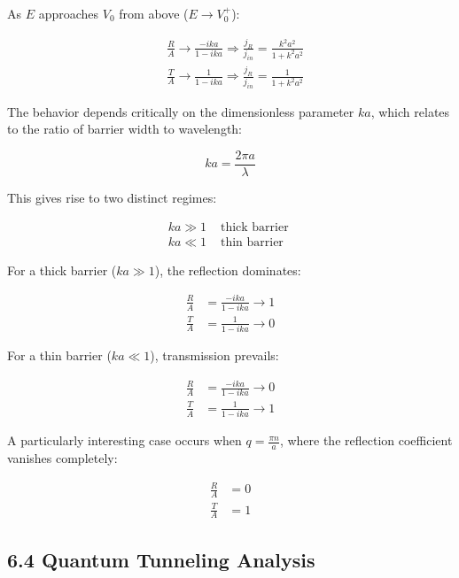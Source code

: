 \documentclass[10pt]{article}
\begin{document}
As $E$ approaches $V_0$ from above ($E \rightarrow V_0^+$):

\begin{align*}
& \frac{R}{A} \rightarrow \frac{-i k a}{1-i k a} \Longrightarrow \frac{j_{R}}{j_{i n}}=\frac{k^{2} a^{2}}{1+k^{2} a^{2}}  \tag{6.67}\\
& \frac{T}{A} \rightarrow \frac{1}{1-i k a} \Longrightarrow \frac{j_{R}}{j_{i n}}=\frac{1}{1+k^{2} a^{2}}
\end{align*}

The behavior depends critically on the dimensionless parameter $ka$, which relates to the ratio of barrier width to wavelength:

\begin{equation*}
k a=\frac{2 \pi a}{\lambda} \tag{6.68}
\end{equation*}

This gives rise to two distinct regimes:

\[
\begin{array}{ll}
k a \gg 1 & \text { thick barrier } \\
k a \ll 1 & \text { thin barrier } \tag{6.69}
\end{array}
\]

For a thick barrier ($ka \gg 1$), the reflection dominates:

\begin{align*}
\frac{R}{A} & =\frac{-i k a}{1-i k a} \rightarrow 1 \\
\frac{T}{A} & =\frac{1}{1-i k a} \rightarrow 0 \tag{6.70}
\end{align*}

For a thin barrier ($ka \ll 1$), transmission prevails:

\begin{align*}
\frac{R}{A} & =\frac{-i k a}{1-i k a} \rightarrow 0 \\
\frac{T}{A} & =\frac{1}{1-i k a} \rightarrow 1 \tag{6.71}
\end{align*}

A particularly interesting case occurs when $q=\frac{\pi n}{a}$, where the reflection coefficient vanishes completely:

\begin{align*}
\frac{R}{A} & =0 \\
\frac{T}{A} & =1 \tag{6.72}
\end{align*}


\subsection*{6.4 Quantum Tunneling Analysis}
\end{document}
